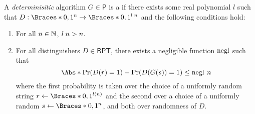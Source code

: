 \documentclass[a5paper]{article}
\begin{document}
\begin{definition}
	A \textit{determinisitic} algorithm $G\in\mathsf{P}$ is a  if there exists some real polynomial $l$ such that
  $D:\braces{0,1}^n\to\braces{0,1}^{\apply{l}{n}}$ and the following conditions hold:
  \begin{enumerate}%
    \itemsep0em
    \item {} For all $n\in\mathbb{N}$, $l\hspace{0.23em} n>n$.
    \item {} For all distinguishers $D\in\mathsf{BPT}$,
      there exists a negligible function $\operatorname{negl}$ such that
      \begin{equation*}
        \abs{\Pr(D(r)=1)-\Pr(D(G(s))=1)}\leq \apply{\negl}{n}
      \end{equation*}
      where the first probability is taken over the choice of a uniformly random
      string $r\leftarrow\braces{0,1}^{l(n)}$ and the second over a choice of a
      uniformly random $s\leftarrow\braces{0,1}^n$, and both over randomness of
      $D$. 
  \end{enumerate}
\end{definition}
\end{document}
